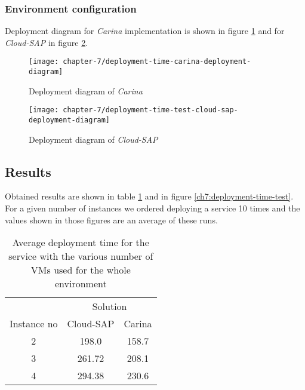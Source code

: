\subsubsection{Environment configuration}
Deployment diagram for \emph{Carina} implementation is shown in figure \ref{ch7:deployment-time-test-deployment-time-carina-deployment-diagram} and for \emph{Cloud-SAP} in figure \ref{ch7:deployment-time-test-cloud-sap-deployment-diagram}.

\begin{figure}[!ht]
  \begin{center}
    \texttt{[image: chapter-7/deployment-time-carina-deployment-diagram]}
  \end{center}
  \caption{Deployment diagram of \emph{Carina}}
  \label{ch7:deployment-time-test-deployment-time-carina-deployment-diagram}
\end{figure}

\begin{figure}[!ht]
  \begin{center}
    \texttt{[image: chapter-7/deployment-time-test-cloud-sap-deployment-diagram]}
  \end{center}
  \caption{Deployment diagram of \emph{Cloud-SAP}}
  \label{ch7:deployment-time-test-cloud-sap-deployment-diagram}
\end{figure}

\subsection*{Results}
Obtained results are shown in table \ref{tbl:test-service-deployment-time} and in figure \ref{ch7:deployment-time-test}. For a given number of instances we ordered deploying a service 10 times and the values shown in those figures are an average of these runs.

\begin{table}
  \centering
  \begin{tabular}{ c  c  c }
    \hline
    & \multicolumn{2}{c}{Solution} \\
    \cline{2-3}
    Instance no & Cloud-SAP & Carina \\
    \hline
    2 & 198.0 & 158.7 \\
    3 & 261.72 & 208.1 \\
    4 & 294.38 & 230.6 \\
    \hline
  \end{tabular}
  \caption{Average deployment time for the service with the various number of VMs used for the whole environment}
  \label{tbl:test-service-deployment-time}
\end{table}

